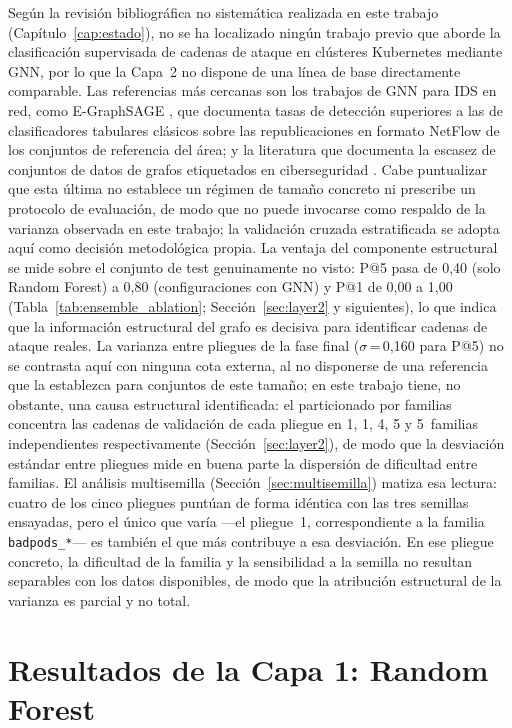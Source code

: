 Según la revisión bibliográfica no sistemática realizada en este trabajo
(Capítulo~\ref{cap:estado}), no se ha localizado ningún trabajo previo que
aborde la clasificación supervisada de cadenas de ataque en clústeres
Kubernetes mediante \acs{GNN}, por lo que la Capa~2 no dispone de una
línea de base directamente comparable. Las referencias más cercanas son los
trabajos de \acs{GNN} para \ac{IDS} en red, como E-GraphSAGE
\citep{Lo2022}, que documenta tasas de detección superiores a las de
clasificadores tabulares clásicos sobre las republicaciones en formato NetFlow
de los conjuntos de referencia del área; y la literatura que documenta la
escasez de conjuntos de datos de grafos etiquetados en ciberseguridad
\citep{GNNSurvey2024}. Cabe puntualizar que esta última no establece un régimen
de tamaño concreto ni prescribe un protocolo de evaluación, de modo que no puede
invocarse como respaldo de la varianza observada en este trabajo; la validación
cruzada estratificada se adopta aquí como decisión metodológica propia. La
ventaja del componente estructural
se mide sobre el conjunto de test genuinamente no visto: P@5 pasa de 0,40
(solo Random Forest) a 0,80 (configuraciones con \ac{GNN}) y P@1 de 0,00 a 1,00
(Tabla~\ref{tab:ensemble_ablation}; Sección~\ref{sec:layer2} y siguientes),
lo que indica que la información estructural del grafo es decisiva para identificar
cadenas de ataque reales. La varianza entre pliegues de la fase final
(\(\sigma\)\,=\,0,160 para P@5) no se contrasta aquí con ninguna cota externa,
al no disponerse de una referencia que la establezca para conjuntos de este
tamaño; en este trabajo tiene, no obstante, una causa estructural identificada: el
particionado por familias concentra las cadenas de validación de cada pliegue en
1, 1, 4, 5 y 5~familias independientes respectivamente
(Sección~\ref{sec:layer2}), de modo que la desviación estándar entre pliegues
mide en buena parte la dispersión de dificultad entre familias. El análisis
multisemilla (Sección~\ref{sec:multisemilla}) matiza esa lectura: cuatro de los
cinco pliegues puntúan de forma idéntica con las tres semillas ensayadas, pero el
único que varía —el pliegue~1, correspondiente a la familia
\texttt{badpods\_*}— es también el que más contribuye a esa desviación. En ese
pliegue concreto, la dificultad de la familia y la sensibilidad a la semilla no
resultan separables con los datos disponibles, de modo que la atribución
estructural de la varianza es parcial y no total.

\section{Resultados de la Capa 1: Random Forest}
\label{sec:layer1}

